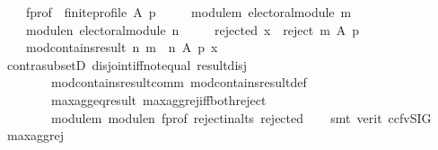 \begin{isabellebody}
\ \ \ \ f{\isacharunderscore}{\kern0pt}prof{\isacharcolon}{\kern0pt}\ \ {\isachardoublequoteopen}finite{\isacharunderscore}{\kern0pt}profile\ A\ p{\isachardoublequoteclose}\ \isanewline
\ \ \ \ module{\isacharunderscore}{\kern0pt}m{\isacharcolon}{\kern0pt}\ {\isachardoublequoteopen}electoral{\isacharunderscore}{\kern0pt}module\ m{\isachardoublequoteclose}\ \isanewline
\ \ \ \ module{\isacharunderscore}{\kern0pt}n{\isacharcolon}{\kern0pt}\ {\isachardoublequoteopen}electoral{\isacharunderscore}{\kern0pt}module\ n{\isachardoublequoteclose}\ \isanewline
\ \ \ \ rejected{\isacharcolon}{\kern0pt}\ {\isachardoublequoteopen}x\ {\isasymin}\ reject\ m\ A\ p{\isachardoublequoteclose}\isanewline
\ \ \isanewline
\ \ \ \ {\isachardoublequoteopen}mod{\isacharunderscore}{\kern0pt}contains{\isacharunderscore}{\kern0pt}result\ n\ {\isacharparenleft}{\kern0pt}m\ {\isasymparallel}\isactrlsub {\isasymup}\ n{\isacharparenright}{\kern0pt}\ A\ p\ x{\isachardoublequoteclose}\isanewline
%
\isadelimproof
\ \ %
\endisadelimproof
%
\isatagproof
{}\isamarkupfalse%
\ contra{\isacharunderscore}{\kern0pt}subsetD\ disjoint{\isacharunderscore}{\kern0pt}iff{\isacharunderscore}{\kern0pt}not{\isacharunderscore}{\kern0pt}equal\ result{\isacharunderscore}{\kern0pt}disj\isanewline
\ \ \ \ \ \ \ \ mod{\isacharunderscore}{\kern0pt}contains{\isacharunderscore}{\kern0pt}result{\isacharunderscore}{\kern0pt}comm\ mod{\isacharunderscore}{\kern0pt}contains{\isacharunderscore}{\kern0pt}result{\isacharunderscore}{\kern0pt}def\isanewline
\ \ \ \ \ \ \ \ max{\isacharunderscore}{\kern0pt}agg{\isacharunderscore}{\kern0pt}eq{\isacharunderscore}{\kern0pt}result\ max{\isacharunderscore}{\kern0pt}agg{\isacharunderscore}{\kern0pt}rej{\isacharunderscore}{\kern0pt}iff{\isacharunderscore}{\kern0pt}both{\isacharunderscore}{\kern0pt}reject\isanewline
\ \ \ \ \ \ \ \ module{\isacharunderscore}{\kern0pt}m\ module{\isacharunderscore}{\kern0pt}n\ f{\isacharunderscore}{\kern0pt}prof\ reject{\isacharunderscore}{\kern0pt}in{\isacharunderscore}{\kern0pt}alts\ rejected\isanewline
\ \ \isamarkupfalse%
\ {\isacharparenleft}{\kern0pt}smt\ {\isacharparenleft}{\kern0pt}verit{\isacharcomma}{\kern0pt}\ ccfv{\isacharunderscore}{\kern0pt}SIG{\isacharparenright}{\kern0pt}{\isacharparenright}{\kern0pt}%
\endisatagproof
{\isafoldproof}%
%
\isadelimproof
\isanewline
%
\endisadelimproof
\isanewline
{}\isamarkupfalse%
\ max{\isacharunderscore}{\kern0pt}agg{\isacharunderscore}{\kern0pt}rej{}{\isacharcolon}{\kern0pt}\isanewline

\end{isabellebody}

